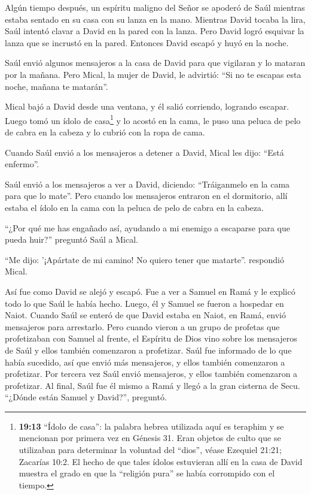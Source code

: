  Algún tiempo después, un espíritu maligno del Señor se
apoderó de Saúl mientras estaba sentado en su casa con su lanza en la
mano. Mientras David tocaba la lira,  Saúl intentó clavar a
David en la pared con la lanza. Pero David logró esquivar la lanza que
se incrustó en la pared. Entonces David escapó y huyó en la noche.

 Saúl envió algunos mensajeros a la casa de David para que
vigilaran y lo mataran por la mañana. Pero Mical, la mujer de David, le
advirtió: ``Si no te escapas esta noche, mañana te matarán''.

 Mical bajó a David desde una ventana, y él salió
corriendo, logrando escapar.  Luego tomó un ídolo de
casa\footnote{\textbf{19:13} ``Ídolo de casa'': la palabra hebrea
  utilizada aquí es teraphim y se mencionan por primera vez en Génesis
  31. Eran objetos de culto que se utilizaban para determinar la
  voluntad del ``dios'', véase Ezequiel 21:21; Zacarías 10:2. El hecho
  de que tales ídolos estuvieran allí en la casa de David muestra el
  grado en que la ``religión pura'' se había corrompido con el tiempo.}
y lo acostó en la cama, le puso una peluca de pelo de cabra en la cabeza
y lo cubrió con la ropa de cama.

 Cuando Saúl envió a los mensajeros a detener a David,
Mical les dijo: ``Está enfermo''.

 Saúl envió a los mensajeros a ver a David, diciendo:
``Tráiganmelo en la cama para que lo mate''.  Pero cuando
los mensajeros entraron en el dormitorio, allí estaba el ídolo en la
cama con la peluca de pelo de cabra en la cabeza.

 ``¿Por qué me has engañado así, ayudando a mi enemigo a
escaparse para que pueda huir?'' preguntó Saúl a Mical.

``Me dijo: '¡Apártate de mi camino! No quiero tener que matarte''.
respondió Mical.

 Así fue como David se alejó y escapó. Fue a ver a Samuel
en Ramá y le explicó todo lo que Saúl le había hecho. Luego, él y Samuel
se fueron a hospedar en Naiot.  Cuando Saúl se enteró de
que David estaba en Naiot, en Ramá,  envió mensajeros para
arrestarlo. Pero cuando vieron a un grupo de profetas que profetizaban
con Samuel al frente, el Espíritu de Dios vino sobre los mensajeros de
Saúl y ellos también comenzaron a profetizar.  Saúl fue
informado de lo que había sucedido, así que envió más mensajeros, y
ellos también comenzaron a profetizar.  Por tercera vez
Saúl envió mensajeros, y ellos también comenzaron a profetizar.
 Al final, Saúl fue él mismo a Ramá y llegó a la gran
cisterna de Secu. ``¿Dónde están Samuel y David?'', preguntó.

